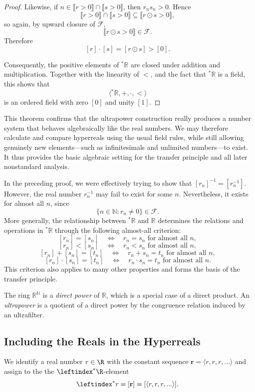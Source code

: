 \begin{proof}
Likewise, if
$n\in\llbracket r>0\rrbracket\cap\llbracket s>0\rrbracket$,
then $r_ns_n>0$. Hence
\[
\llbracket r>0\rrbracket\cap\llbracket s>0\rrbracket
\subseteq
\llbracket r\odot s>0\rrbracket,
\]
so again, by upward closure of $\mathcal{F}$,
\[
\llbracket r\odot s>0\rrbracket\in\mathcal{F}.
\]
Therefore
\[
[r]\cdot[s]=[r\odot s]>[0].
\]

Consequently, the positive elements of ${}^*\mathbb{R}$ are closed
under addition and multiplication. Together with the linearity of $<$,
and the fact that ${}^*\mathbb{R}$ is a field, this shows that
\[
\langle{}^*\mathbb{R},+,\cdot,<\rangle
\]
is an ordered field with zero $[0]$ and unity $[1]$.
\end{proof}

This theorem confirms that the ultrapower construction really produces a number system that behaves algebraically like the real numbers. We may therefore calculate and compare hyperreals using the usual field rules, while still allowing genuinely new elements—such as infinitesimals and unlimited numbers—to exist. It thus provides the basic algebraic setting for the transfer principle and all later nonstandard analysis. 

In the preceding proof, we were effectively trying to show that $[r_n]^{-1} = [r_n^{-1}]$. However, the real number $r_n^{-1}$ may fail to exist for some $n$. Nevertheless, it exists for almost all $n$, since
\[
\{n \in \mathbb{N} : r_n \neq 0\} \in \mathcal{F}.
\]
More generally, the relationship between ${}^\ast\mathbb{R}$ and $\mathbb{R}$ determines the relations and operations in ${}^\ast\mathbb{R}$ through the following almost-all criterion:
\[
[r_n] = [s_n]
\quad\Longleftrightarrow\quad
r_n = s_n \text{ for almost all } n,
\]
\[
[r_n] < [s_n]
\quad\Longleftrightarrow\quad
r_n < s_n \text{ for almost all } n,
\]
\[
[r_n] + [s_n] = [t_n]
\quad\Longleftrightarrow\quad
r_n + s_n = t_n \text{ for almost all } n,
\]
\[
[r_n] \cdot [s_n] = [t_n]
\quad\Longleftrightarrow\quad
r_n \cdot s_n = t_n \text{ for almost all } n.
\]
This criterion also applies to many other properties and forms the basis of the transfer principle.

The ring $\mathbb{R}^{\mathbb{N}}$ is a \emph{direct power} of $\mathbb{R}$, which is a special case of a direct product. An \emph{ultrapower} is a quotient of a direct power by the congruence relation induced by an ultrafilter.

\subsection{Including the Reals in the Hyperreals}
We identify a real number $r \in \R$ with the constant sequence $\mathbf{r}=\langle r,r,r,... \rangle$ and assign to the the $\leftindex^* {\R}$-element
$$
\leftindex^* {r} = [\textbf{r}] = [\langle r,r,r,...\rangle].
$$


